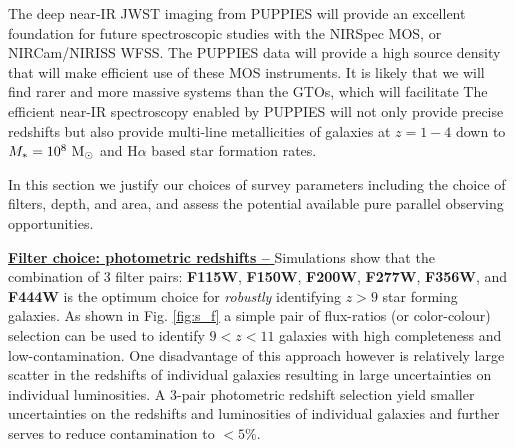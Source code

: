 \documentclass[12pt]{article}
\begin{document}







The deep near-IR JWST imaging from PUPPIES will provide an excellent foundation for future spectroscopic studies with the NIRSpec MOS, or NIRCam/NIRISS WFSS.   The PUPPIES data will provide a high source density that will make efficient use of these MOS instruments.   It is likely that we will find rarer and more massive systems than the GTOs, which will facilitate The efficient near-IR spectroscopy enabled by PUPPIES will not only provide precise redshifts but also provide multi-line metallicities of galaxies at $z=1-4$ down to $M_{*}=10^{8}\ {\rm M_{\odot}}$ and H$\alpha$ based star formation rates. 







%
%

\clearpage

\justifyobservations   %

In this section we justify our choices of survey parameters including the choice of filters, depth, and area, and assess the potential available pure parallel observing opportunities.

\vspace{5mm}
\noindent
\underline{\bf Filter choice: photometric redshifts -- } Simulations show that the combination of 3 filter pairs: {\bf F115W}, {\bf F150W}, {\bf F200W}, {\bf F277W}, {\bf F356W}, and {\bf F444W} is the optimum choice for \emph{robustly} identifying $z>9$ star forming galaxies. As shown in Fig. \ref{fig:s_f} a simple pair of flux-ratios (or color-colour) selection can be used to identify $9<z<11$ galaxies with high completeness and low-contamination. One disadvantage of this approach however is relatively large scatter in the redshifts of individual galaxies resulting in large uncertainties on individual luminosities. A 3-pair photometric redshift selection yield smaller uncertainties on the redshifts and luminosities of individual galaxies and further serves to reduce contamination to $<5\%$.
\end{document}
